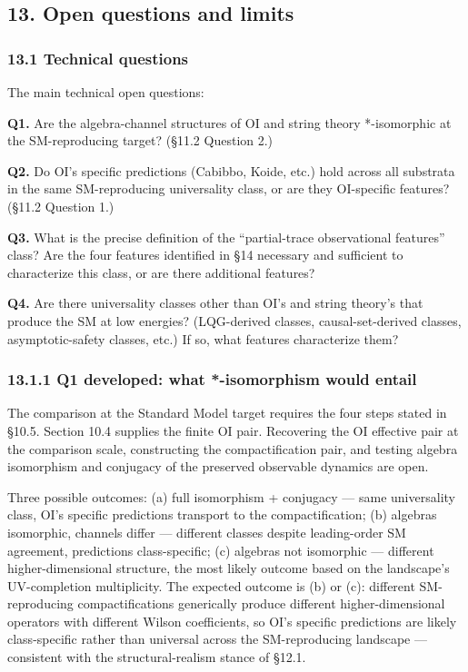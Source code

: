 \documentclass[
]{article}
\begin{document}
\hypertarget{open-questions-and-limits}{%
\subsection{13. Open questions and
limits}\label{open-questions-and-limits}}

\hypertarget{technical-questions}{%
\subsubsection{13.1 Technical questions}\label{technical-questions}}

The main technical open questions:

\textbf{Q1.} Are the algebra-channel structures of OI and string theory
*-isomorphic at the SM-reproducing target? (§11.2 Question 2.)

\textbf{Q2.} Do OI's specific predictions (Cabibbo, Koide, etc.) hold
across all substrata in the same SM-reproducing universality class, or
are they OI-specific features? (§11.2 Question 1.)

\textbf{Q3.} What is the precise definition of the ``partial-trace
observational features'' class? Are the four features identified in §14
necessary and sufficient to characterize this class, or are there
additional features?

\textbf{Q4.} Are there universality classes other than OI's and string
theory's that produce the SM at low energies? (LQG-derived classes,
causal-set-derived classes, asymptotic-safety classes, etc.) If so, what
features characterize them?

\hypertarget{q1-developed-what--isomorphism-would-entail}{%
\subsubsection{13.1.1 Q1 developed: what *-isomorphism would
entail}\label{q1-developed-what--isomorphism-would-entail}}

The comparison at the Standard Model target requires the four steps
stated in §10.5. Section 10.4 supplies the finite OI pair. Recovering
the OI effective pair at the comparison scale, constructing the
compactification pair, and testing algebra isomorphism and conjugacy of
the preserved observable dynamics are open.

Three possible outcomes: (a) full isomorphism + conjugacy --- same
universality class, OI's specific predictions transport to the
compactification; (b) algebras isomorphic, channels differ --- different
classes despite leading-order SM agreement, predictions class-specific;
(c) algebras not isomorphic --- different higher-dimensional structure,
the most likely outcome based on the landscape's UV-completion
multiplicity. The expected outcome is (b) or (c): different
SM-reproducing compactifications generically produce different
higher-dimensional operators with different Wilson coefficients, so OI's
specific predictions are likely class-specific rather than universal
across the SM-reproducing landscape --- consistent with the
structural-realism stance of §12.1.
\end{document}
